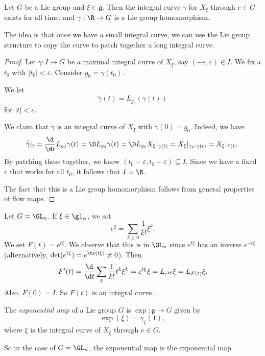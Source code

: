 \documentclass[a4paper]{article}
\begin{document}
\begin{prop}
  Let $G$ be a Lie group and $\xi \in \mathfrak{g}$. Then the integral curve $\gamma$ for $X_\xi$ through $e \in G$ exists for all time, and $\gamma: \R \to G$ is a Lie group homomorphism.
\end{prop}

The idea is that once we have a small integral curve, we can use the Lie group structure to copy the curve to patch together a long integral curve.
\begin{proof}
  Let $\gamma: I \to G$ be a maximal integral curve of $X_\xi$, say $(-\varepsilon, \varepsilon) \in I$. We fix a $t_0$ with $|t_0| < \varepsilon$. Consider $g_0 = \gamma(t_0)$.

  We let
  \[
    \tilde{\gamma}(t) = L_{g_0}(\gamma(t))
  \]
  for $|t| < \varepsilon$.

  We claim that $\tilde{\gamma}$ is an integral curve of $X_\xi$ with $\tilde{\gamma}(0) = g_0$. Indeed, we have
  \[
    \dot{\tilde{\gamma}}|_t = \frac{\d}{\d t} L_{g_0}\gamma(t) = \D L_{g_0} \dot{\gamma}(t) = \D L_{g_0} X_\xi|_{\gamma(t)} = X_\xi|_{\gamma_0 \cdot \gamma(t)} = X_\xi|_{\tilde{\gamma}(t)}.
  \]
  By patching these together, we know $(t_0 - \varepsilon, t_0 + \varepsilon) \subseteq I$. Since we have a fixed $\varepsilon$ that works for all $t_0$, it follows that $I = \R$.

  The fact that this is a Lie group homomorphism follows from general properties of flow maps.
\end{proof}

\begin{eg}
  Let $G = \GL_n$. If $\xi \in \gl_n$, we set
  \[
    e^\xi = \sum_{k \geq 0} \frac{1}{k!} \xi^k.
  \]
  We set $F(t) = e^{t \xi}$. We observe that this is in $\GL_n$ since $e^{t\xi}$ has an inverse $e^{-t\xi}$ (alternatively, $\det (e^{t\xi}) = e^{\tr (t\xi)} \not= 0$). Then
  \[
    F'(t) = \frac{\d}{\d t} \sum_k \frac{1}{k!} t^k \xi^k = e^{t\xi} \xi = L_{e^{t\xi}}\xi = L_{F(t)}\xi.
  \]
  Also, $F(0) = I$. So $F(t)$ is an integral curve.
\end{eg}

\begin{defi}
  The \emph{exponential map} of a Lie group $G$ is $\exp: \mathfrak{g} \to G$ given by
  \[
    \exp(\xi) = \gamma_\xi(1),
  \]
  where $\xi$ is the integral curve of $X_\xi$ through $e \in G$.
\end{defi}
So in the case of $G = \GL_n$, the exponential map is the exponential map.
\end{document}
